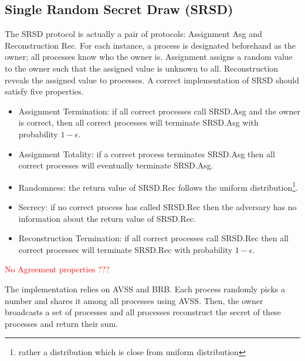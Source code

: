 \subsection{Single Random Secret Draw (\textsf{SRSD})}
The \textsf{SRSD} protocol is actually a pair of protocols: Assignment \textsf{Asg} and
Reconstruction \textsf{Rec}.
For each instance, a process is designated beforehand as the owner;
all processes know who the owner is. Assignment assigns a random value to the
owner such that the assigned value is unknown to all. Reconstruction reveals the
assigned value to processes. A correct implementation of \textsf{SRSD} should
satisfy five properties.
\begin{itemize}
    \item Assignment Termination: if all correct processes call \textsf{SRSD}.\textsf{Asg} and the 
    owner is correct, then all correct processes will terminate \textsf{SRSD}.\textsf{Asg} with 
    probability $1-\epsilon$.
    \item Assignment Totality: if a correct process terminates \textsf{SRSD}.\textsf{Asg}
    then all correct processes will eventually terminate \textsf{SRSD}.\textsf{Asg}.
    \item Randomness: the return value of \textsf{SRSD}.\textsf{Rec} follows the uniform
    distribution\footnote{rather a distribution which is close from uniform distribution}.
    \item Secrecy: if no correct process has called \textsf{SRSD}.\textsf{Rec} then the adversary
    has no information about the return value of \textsf{SRSD}.\textsf{Rec}.
    \item Reconstruction Termination: if all correct processes call \textsf{SRSD}.\textsf{Rec} then
    all correct processes will terminate \textsf{SRSD}.\textsf{Rec} with probability $1-\epsilon$.
\end{itemize}

\textcolor{red}{\large No Agreement properties ???}

\begin{implementation}
    \label{impl:SRSD}

    The implementation relies on \textsf{AVSS} and \textsf{BRB}. Each process
    randomly picks a number and shares it among all processes using \textsf{AVSS}.
    Then, the owner broadcasts a set of processes and all processes reconstruct
    the secret of these processes and return their sum.
\end{implementation}

